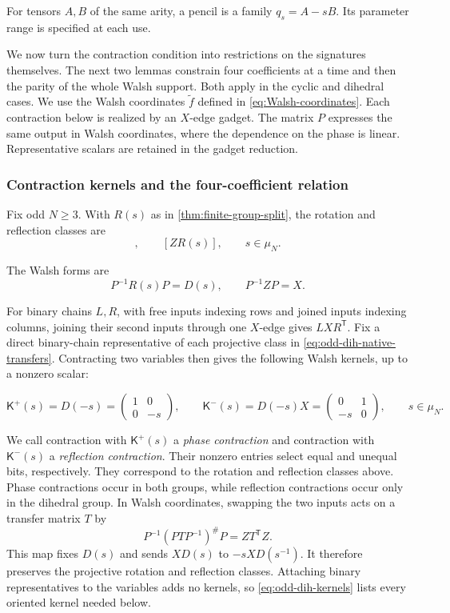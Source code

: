 \documentclass[11pt,letterpaper,onecolumn]{article}
\theoremstyle{plain}
\theoremstyle{definition}
\theoremstyle{remark}
\begin{document}
	
	For tensors \(A,B\) of the same arity, a pencil is a family \(q_s=A-sB\).
	Its parameter range is specified at each use.
	
	
	
	We now turn the contraction condition into restrictions on the signatures
	themselves. The next two lemmas constrain four coefficients at a time and
	then the parity of the whole Walsh support. Both apply in the cyclic and
	dihedral cases.
We use the Walsh coordinates \(\widetilde f\) defined in
\cref{eq:Walsh-coordinates}.
	Each contraction below is realized by an \(X\)-edge gadget.
The matrix \(P\) expresses the same output in Walsh coordinates, where
the dependence on the phase is linear. Representative scalars are retained
in the gadget reduction.
	
	\subsubsection{Contraction kernels and the four-coefficient relation}
	\label{subsec:odd-dih-cards}
	
	Fix odd \(N\ge3\).  With \(R(s)\) as in
	\cref{thm:finite-group-split}, the rotation and reflection classes are
	\begin{equation}
		[R(s)],\qquad[ZR(s)],
		\qquad s\in\mu_N.
		\label{eq:odd-dih-native-transfers}
	\end{equation}
	
	The Walsh forms are
	\[
	P^{-1}R(s)P=D(s),
	\qquad P^{-1}ZP=X.
	\]
	
	For binary chains \(L,R\), with free inputs indexing rows and joined
	inputs indexing columns, joining their second inputs through one \(X\)-edge
	gives \(LXR^{\mathsf T}\).  Fix a direct binary-chain representative of
	each projective class in \cref{eq:odd-dih-native-transfers}.  Contracting
	two variables then gives the following Walsh kernels,
	up to a nonzero scalar:
	
	\begin{equation}
		\mathsf K^+(s)=D(-s)=\begin{pmatrix}1&0\\0&-s\end{pmatrix},
		\qquad
		\mathsf K^-(s)=D(-s)X=\begin{pmatrix}0&1\\-s&0\end{pmatrix},
		\qquad s\in\mu_N.
		\label{eq:odd-dih-kernels}
	\end{equation}
	
	We call contraction with \(\mathsf K^+(s)\) a \emph{phase contraction}
and contraction with \(\mathsf K^-(s)\) a \emph{reflection contraction}.
Their nonzero entries select equal and unequal bits, respectively.
They correspond to the rotation and reflection classes above.
Phase contractions occur in both groups, while reflection contractions occur
only in the dihedral group. In Walsh coordinates, swapping the two inputs acts on a
transfer matrix \(T\) by
\[
P^{-1}(PTP^{-1})^\#P=ZT^{\mathsf T}Z.
\]
This map fixes \(D(s)\) and sends \(XD(s)\) to \(-sXD(s^{-1})\).
It therefore preserves the projective rotation and reflection classes.
Attaching binary representatives to the variables adds no kernels, so
\cref{eq:odd-dih-kernels} lists every oriented kernel needed below.
	
\end{document}
